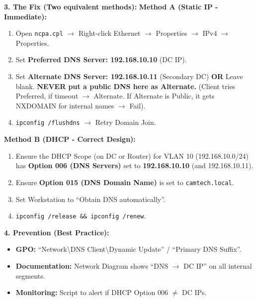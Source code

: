 \documentclass[11pt]{article}
\begin{document}
\begin{exoresolu}
\noindent\textbf{3. The Fix (Two equivalent methods):}
\textbf{Method A (Static IP - Immediate):}
\begin{enumerate}
    \item Open \texttt{ncpa.cpl} $\rightarrow$ Right-click Ethernet $\rightarrow$ Properties $\rightarrow$ IPv4 $\rightarrow$ Properties.
    \item Set \textbf{Preferred DNS Server: 192.168.10.10} (DC IP).
    \item Set \textbf{Alternate DNS Server: 192.168.10.11} (Secondary DC) \textbf{OR} Leave blank. \textbf{NEVER put a public DNS here as Alternate.} (Client tries Preferred, if timeout $\rightarrow$ Alternate. If Alternate is Public, it gets NXDOMAIN for internal names $\rightarrow$ Fail).
    \item \texttt{ipconfig /flushdns} $\rightarrow$ Retry Domain Join.
\end{enumerate}

\textbf{Method B (DHCP - Correct Design):}
\begin{enumerate}
    \item Ensure the DHCP Scope (on DC or Router) for VLAN 10 (192.168.10.0/24) has \textbf{Option 006 (DNS Servers)} set to \textbf{192.168.10.10} (and 192.168.10.11).
    \item Ensure \textbf{Option 015 (DNS Domain Name)} is set to \texttt{camtech.local}.
    \item Set Workstation to ``Obtain DNS automatically''.
    \item \texttt{ipconfig /release \&\& ipconfig /renew}.
\end{enumerate}

\noindent\textbf{4. Prevention (Best Practice):}
\begin{itemize}
    \item \textbf{GPO:} ``Network\textbackslash{}DNS Client\textbackslash{}Dynamic Update'' / ``Primary DNS Suffix''.
    \item \textbf{Documentation:} Network Diagram shows ``DNS $\rightarrow$ DC IP'' on all internal segments.
    \item \textbf{Monitoring:} Script to alert if DHCP Option 006 $\neq$ DC IPs.
\end{itemize}
\end{exoresolu}
\end{document}
